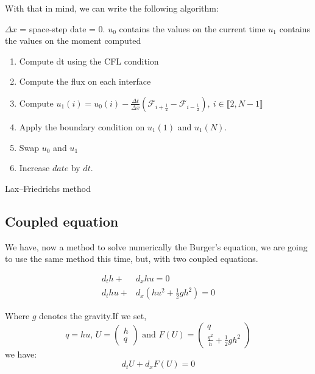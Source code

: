         With that in mind, we can write the following algorithm:
        \begin{algorithm}[h]
            $\Delta x$ = space-step\;
            date = 0.
            $u_0$ contains the values on the current time
            $u_1$ contains the values on the moment computed
            
            {
                 \begin{enumerate}
                     \item Compute dt using the CFL condition
                     \item Compute the flux on each interface
                     \item Compute $u_1(i)=u_0(i) - \frac{\Delta t}{\Delta x}(\mathcal{F}_{i+\frac{1}{2}} - \mathcal{F}_{i-\frac{1}{2}}),~ i\in \llbracket 2,N-1 \rrbracket$
                     \item Apply the boundary condition on $u_1\left(1\right)$ and $u_1\left(N\right)$.
                     \item Swap $ u_0$ and $u_1$
                     \item Increase $date$ by $dt$.
                 \end{enumerate}
            }
        \caption{Lax–Friedrichs method}
        \end{algorithm}
        
    \subsection{Coupled equation}
        We have, now a method to solve numerically the Burger's equation, we are going to use the same method this time, but, with two coupled equations.
        
        \begin{align*}
            d_t h + &d_x hu =0\\
            d_t hu + &d_x (hu^2 + \frac{1}{2}gh^2) =0
        \end{align*}
        
        Where $g$ denotes the gravity.If we set,
        \begin{equation*}
            q= hu \text{, } U = \begin{pmatrix} h\\ q\end{pmatrix}\text{ and } F(U) = \begin{pmatrix} q\\ \frac{q^2}{h} + \frac{1}{2}gh^2\end{pmatrix}
        \end{equation*}
        we have:
        \begin{equation*}
            d_t U+d_x F(U) = 0
        \end{equation*}
        
